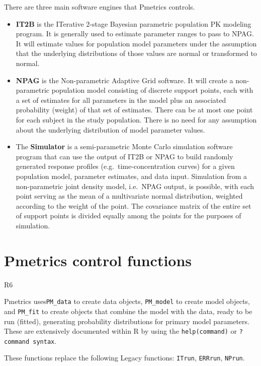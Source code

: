 \documentclass[
]{book}
\begin{document}
There are three main software engines that Pmetrics controls.

\begin{itemize}
\item
  \textbf{IT2B} is the ITerative 2-stage Bayesian parametric population PK modeling
  program. It is generally used to estimate parameter ranges to pass to
  NPAG. It will estimate values for population model parameters under the
  assumption that the underlying distributions of those values are normal
  or transformed to normal.
\item
  \textbf{NPAG} is the Non-parametric Adaptive Grid software. It will create a
  non-parametric population model consisting of discrete support points,
  each with a set of estimates for all parameters in the model plus an
  associated probability (weight) of that set of estimates. There can be
  at most one point for each subject in the study population. There is no
  need for any assumption about the underlying distribution of model
  parameter values.
\item
  The \textbf{Simulator} is a semi-parametric Monte Carlo simulation software
  program that can use the output of IT2B or NPAG to build randomly
  generated response profiles (e.g.~time-concentration curves) for a given
  population model, parameter estimates, and data input. Simulation from a
  non-parametric joint density model, i.e.~NPAG output, is possible, with
  each point serving as the mean of a multivariate normal distribution,
  weighted according to the weight of the point. The covariance matrix of
  the entire set of support points is divided equally among the points for
  the purposes of simulation.
\end{itemize}

\hypertarget{pmetrics-control-functions}{%
\section{Pmetrics control functions}\label{pmetrics-control-functions}}

{R6}

Pmetrics uses\texttt{PM\_data} to create data objects, \texttt{PM\_model} to create model
objects, and \texttt{PM\_fit} to create
objects that combine the model with the data, ready to be run (fitted),
generating probability distributions for primary model parameters.
These are extensively
documented within R by using the \texttt{help(command)} or \texttt{?command\ syntax}.

These functions replace the following Legacy functions: \texttt{ITrun}, \texttt{ERRrun},
\texttt{NPrun}.
\end{document}
